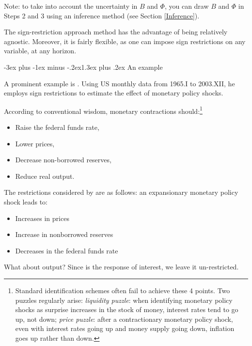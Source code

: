 \documentclass[
  11pt,
]{book}
\makeatletter
\providecommand{\tightlist}{%
  \setlength{\itemsep}{0pt}\setlength{\parskip}{0pt}}
\renewcommand\section{\@startsection{section}{1}{\z@}
  {-3ex plus -1ex minus -.2ex}{1.3ex plus .2ex}
  {\normalfont\Large\bfseries\color{TextbookInk}}}
\theoremstyle{definition}
\theoremstyle{definition}
\theoremstyle{definition}
\theoremstyle{definition}
\theoremstyle{remark}
\makeatother
\begin{document}
Note: to take into account the uncertainty in \(B\) and \(\Phi\), you can draw \(B\) and \(\Phi\) in Steps 2 and 3 using an inference method (see Section \ref{Inference}).

The sign-restriction approach method has the advantage of being relatively agnostic. Moreover, it is fairly flexible, as one can impose sign restrictions on any variable, at any horizon.

\section{An example}\label{an-example}

A prominent example is \citet{Uhlig_2005}. Using US monthly data from 1965.I to 2003.XII, he employs sign restrictions to estimate the effect of monetary policy shocks.

According to conventional wisdom, monetary contractions should:\footnote{Standard identification schemes often fail to achieve these 4 points. Two puzzles regularly arise: \emph{liquidity puzzle}: when identifying monetary policy shocks as surprise increases in the stock of money, interest rates tend to go up, not down; \emph{price puzzle}: after a contractionary monetary policy shock, even with interest rates going up and money supply going down, inflation goes up rather than down.}

\begin{itemize}
\tightlist
\item
  Raise the federal funds rate,
\item
  Lower prices,
\item
  Decrease non-borrowed reserves,
\item
  Reduce real output.
\end{itemize}

The restrictions considered by \citet{Uhlig_2005} are as follows: an expansionary monetary policy shock leads to:

\begin{itemize}
\tightlist
\item
  Increases in prices
\item
  Increase in nonborrowed reserves
\item
  Decreases in the federal funds rate
\end{itemize}

What about output? Since is the response of interest, we leave it un-restricted.
\end{document}
